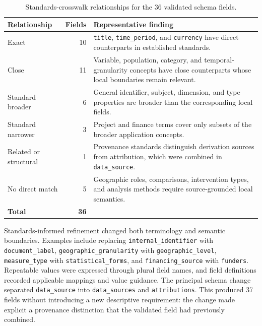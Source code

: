 \documentclass{article}
\begin{document}
\begin{table}[!ht]
    \centering
    \caption{Standards-crosswalk relationships for the 36 validated schema fields.}
    \label{tab:standards_crosswalk_results}
    \renewcommand{\arraystretch}{1.25}
    \small
    \begin{tabularx}{\textwidth}{>{\RaggedRight\arraybackslash}p{} r >{\RaggedRight\arraybackslash}X}
        \toprule
        \textbf{Relationship} & \textbf{Fields} & \textbf{Representative finding} \\
        \midrule
        Exact & 10 & \texttt{title}, \texttt{time\_period}, and \texttt{currency} have direct counterparts in established standards. \\
        Close & 11 & Variable, population, category, and temporal-granularity concepts have close counterparts whose local boundaries remain relevant. \\
        Standard broader & 6 & General identifier, subject, dimension, and type properties are broader than the corresponding local fields. \\
        Standard narrower & 3 & Project and finance terms cover only subsets of the broader application concepts. \\
        Related or structural & 1 & Provenance standards distinguish derivation sources from attribution, which were combined in \texttt{data\_source}. \\
        No direct match & 5 & Geographic roles, comparisons, intervention types, and analysis methods require source-grounded local semantics. \\
        \midrule
        \textbf{Total} & \textbf{36} & \\
        \bottomrule
    \end{tabularx}
\end{table}

Standards-informed refinement changed both terminology and semantic boundaries. Examples include replacing \texttt{internal\_identifier} with \texttt{document\_label}, \texttt{geographic\_granularity} with \texttt{geographic\_level}, \texttt{measure\_type} with \texttt{statistical\_forms}, and \texttt{financing\_source} with \texttt{funders}. Repeatable values were expressed through plural field names, and field definitions recorded applicable mappings and value guidance. The principal schema change separated \texttt{data\_source} into \texttt{data\_sources} and \texttt{attributions}. This produced 37 fields without introducing a new descriptive requirement: the change made explicit a provenance distinction that the validated field had previously combined.
\end{document}
